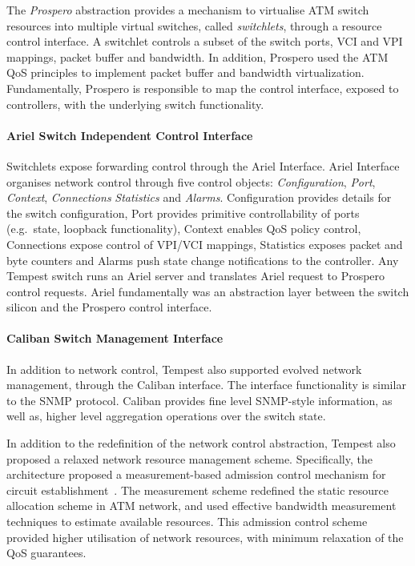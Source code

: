 The \emph{Prospero} abstraction provides a mechanism to virtualise ATM switch
resources into multiple virtual switches, called \emph{switchlets}, through a
resource control interface.  A switchlet controls a subset of the switch ports,
VCI and VPI mappings, packet buffer and bandwidth. In addition, Prospero used
the ATM QoS principles to implement packet buffer and bandwidth virtualization.
Fundamentally, Prospero is responsible to map the control interface, exposed to controllers,
with the underlying switch functionality. 

\paragraph{Ariel Switch Independent Control Interface} 

Switchlets expose forwarding control through the Ariel Interface. Ariel
Interface organises network control through five control objects:
\emph{Configuration}, \emph{Port}, \emph{Context}, {\it Connections}
\emph{Statistics} and \emph{Alarms}.  Configuration provides details for the
switch configuration, Port provides primitive controllability of ports
(e.g.~state, loopback functionality), Context enables QoS policy control,
Connections expose control of VPI/VCI mappings, Statistics exposes packet and
byte counters and Alarms push state change notifications to the controller. Any
Tempest switch runs an Ariel server and translates Ariel request to Prospero
control requests. Ariel fundamentally was an abstraction layer between the
switch silicon and the Prospero control interface. 

\paragraph{Caliban Switch Management Interface}

In addition to network control, Tempest also supported evolved network
management, through the Caliban interface. The interface functionality is
similar to the SNMP protocol. Caliban provides fine level SNMP-style
information, as well as, higher level aggregation operations over the switch
state. 

In addition to the redefinition of the network control abstraction, Tempest also
proposed a relaxed network resource management scheme.  Specifically, the
architecture proposed a measurement-based admission control mechanism for
circuit establishment~\cite{Lewis1998}. The measurement scheme redefined the
static resource allocation scheme in ATM network, and used effective bandwidth
measurement techniques to estimate available resources.  This admission control
scheme provided higher utilisation of network resources, with minimum relaxation
of the QoS guarantees. 

